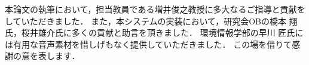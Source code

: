 \begin{acknowledgment}

本論文の執筆において，担当教員である増井俊之教授に多大なるご指導と貢献をしていただきました．
また，本システムの実装において，研究会OBの橋本 翔氏，桜井雄介氏に多くの貢献と助言を頂きました．
環境情報学部の早川 匠氏には有用な音声素材を惜しげもなく提供していただきました．
この場を借りて感謝の意を表します．

\end{acknowledgment}
